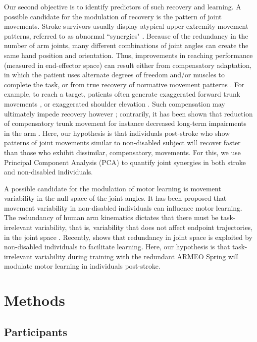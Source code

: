 Our second objective is to identify predictors of such recovery and learning. 
A possible candidate for the modulation of recovery is the pattern of joint movements. 
Stroke survivors usually display atypical upper extremity movement patterns, referred to as abnormal ``synergies" \cite{Brunnstroem1970}. 
Because of the redundancy in the number of arm joints, many different combinations of joint angles can create the same hand position and orientation. 
Thus, improvements in reaching performance (measured in end-effector space) can result either from compensatory adaptation, in which the patient uses alternate degrees of freedom and/or muscles to complete the task, or from true recovery of normative movement patterns \cite{Roby-Brami2003}. 
For example, to reach a target, patients often generate exaggerated forward trunk movements \cite{Roby-Brami2003}, or exaggerated shoulder elevation \cite{Steenbergen2000}.  
Such compensation may ultimately impede recovery however \cite{Roby-Brami2003}; contrarily, it has been shown that reduction of compensatory trunk movement for instance decreased long-term impairments in the arm \cite{Michaelsen2006}. 
Here, our hypothesis is that individuals post-stroke who show patterns of joint movements similar to non-disabled subject will recover faster than those who exhibit dissimilar, compensatory, movements.
For this, we use Principal Component Analysis (PCA) to quantify joint synergies \cite{Kordelaar2012} in both stroke and non-disabled individuals.

A possible candidate for the modulation of motor learning is movement variability in the null space of the joint angles. 
It has been proposed that movement variability in non-disabled individuals can influence motor learning. 
The redundancy of human arm kinematics dictates that there must be task-irrelevant variability, that is, variability that does not affect endpoint trajectories, in the joint space \cite{Scholz1999}. 
Recently, \cite{Singh2016} shows that redundancy in joint space is exploited by non-disabled individuals to facilitate learning. 
Here, our hypothesis is that task-irrelevant variability during training with the redundant ARMEO Spring will modulate motor learning in individuals post-stroke.

 

\section{Methods}

\subsection{Participants}

